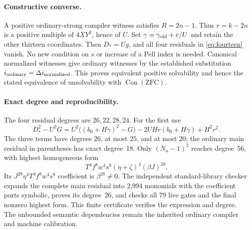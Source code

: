 \paragraph{Constructive converse.}
A positive ordinary-strong compiler witness satisfies $R=2n-1$.
Thus $r=k-2n$ is a positive multiple of $4XY^2$, hence of $U$.
Set $\gamma=\gamma_{\rm old}+r/U$ and retain the other thirteen
coordinates. Then $D_*=Ug$, and all four residuals in
\eqref{eq:fourteen} vanish. No new condition on $s$ or increase of a
Pell index is needed. Canonical normalized witnesses give ordinary
witnesses by the established substitution
$i_{\rm ordinary}=\Delta i_{\rm normalized}$.
This proves equivalent positive solvability and hence the stated
equivalence of unsolvability with $\operatorname{Con}(\mathrm{ZFC})$.

\paragraph{Exact degree and reproducibility.}
The four residual degrees are $26,22,28,24$. For the first use
\[
 D_*^2-U^2G
 =U^2\bigl((b_0+H\gamma)^2-G\bigr)
  -2UHr(b_0+H\gamma)+H^2r^2.
\]
The three terms have degrees $26$, at most $25$, and at most $20$;
the ordinary main residual in parentheses has exact degree~18.
Only $(N_a-1)^2$ reaches degree~56, with highest homogeneous form
\[
 T^4f^8w^4s^8(\eta+\zeta)^4(\beta J)^{28}.
\]
Its $J^{28}\eta^4T^4f^8w^4s^8$ coefficient is
$\beta^{28}\ne0$. The independent standard-library checker expands
the complete main residual into 2,994 monomials with the coefficient
ports symbolic, proves its degree~26, and checks all 79 live gates
and the final nonzero highest form. This finite certificate verifies
the expression and degree. The unbounded semantic dependencies remain
the inherited ordinary compiler and machine calibration.
